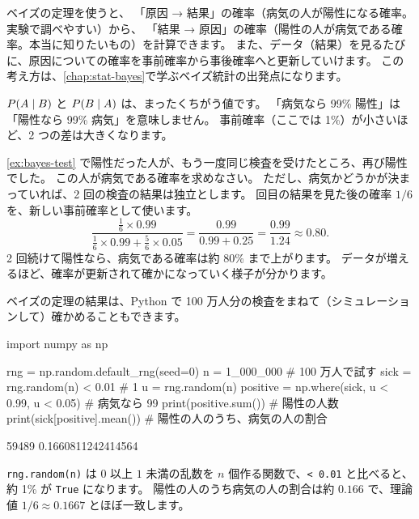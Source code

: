 \begin{merit}
  ベイズの定理を使うと、
  「原因 → 結果」の確率（病気の人が陽性になる確率。実験で調べやすい）から、
  「結果 → 原因」の確率（陽性の人が病気である確率。本当に知りたいもの）を計算できます。
  また、データ（結果）を見るたびに、原因についての確率を事前確率から事後確率へと更新していけます。
  この考え方は、\cref{chap:stat-bayes}で学ぶベイズ統計の出発点になります。
\end{merit}

\begin{exampoint}
  $P(A \mid B)$ と $P(B \mid A)$ は、まったくちがう値です。
  「病気なら 99\% 陽性」は「陽性なら 99\% 病気」を意味しません。
  事前確率（ここでは 1\%）が小さいほど、2 つの差は大きくなります。
\end{exampoint}

\begin{problem}
  \cref{ex:bayes-test} で陽性だった人が、もう一度同じ検査を受けたところ、再び陽性でした。
  この人が病気である確率を求めなさい。
  ただし、病気かどうかが決まっていれば、2 回の検査の結果は独立とします。
   回目の結果を見た後の確率 $1/6$ を、新しい事前確率として使います。
  \[
    \frac{\frac{1}{6} \times 0.99}{\frac{1}{6} \times 0.99 + \frac{5}{6} \times 0.05}
    = \frac{0.99}{0.99 + 0.25}
    = \frac{0.99}{1.24} \approx 0.80.
  \]
  2 回続けて陽性なら、病気である確率は約 80\% まで上がります。
  データが増えるほど、確率が更新されて確かになっていく様子が分かります。
\end{problem}

ベイズの定理の結果は、Python で 100 万人分の検査をまねて（シミュレーションして）確かめることもできます。

\begin{pycode}[検査のシミュレーション]
import numpy as np

rng = np.random.default_rng(seed=0)
n = 1_000_000                       # 100 万人で試す
sick = rng.random(n) < 0.01         # 1%
u = rng.random(n)
positive = np.where(sick, u < 0.99, u < 0.05)  # 病気なら 99%
print(positive.sum())               # 陽性の人数
print(sick[positive].mean())        # 陽性の人のうち、病気の人の割合
\end{pycode}

\begin{pyoutput}
59489
0.1660811242414564
\end{pyoutput}

\texttt{rng.random(n)} は $0$ 以上 $1$ 未満の乱数を $n$ 個作る関数で、\texttt{< 0.01} と比べると、約 1\% が \texttt{True} になります。
陽性の人のうち病気の人の割合は約 $0.166$ で、理論値 $1/6 \approx 0.1667$ とほぼ一致します。

